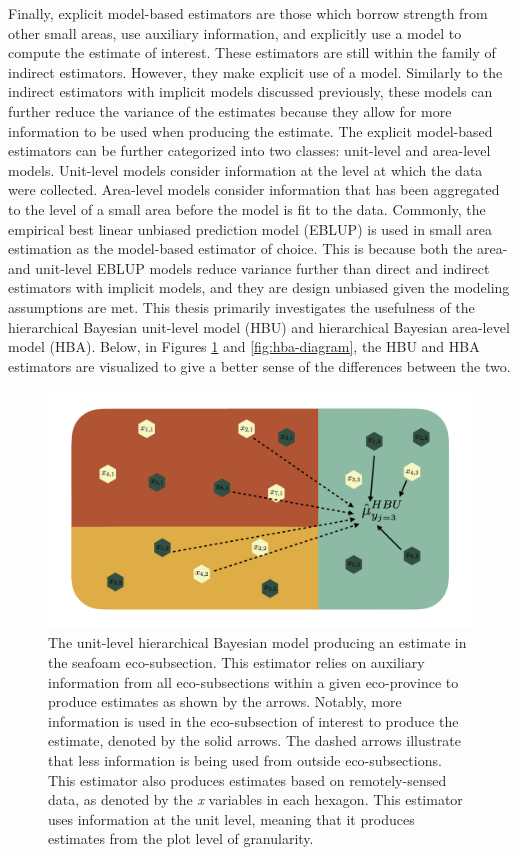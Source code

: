 \documentclass[12pt,twoside]{reedthesis}
\begin{document}
Finally, explicit model-based estimators are those which borrow strength from other small areas, use auxiliary information, and explicitly use a model to compute the estimate of interest. These estimators are still within the family of indirect estimators. However, they make explicit use of a model. Similarly to the indirect estimators with implicit models discussed previously, these models can further reduce the variance of the estimates because they allow for more information to be used when producing the estimate. The explicit model-based estimators can be further categorized into two classes: unit-level and area-level models. Unit-level models consider information at the level at which the data were collected. Area-level models consider information that has been aggregated to the level of a small area before the model is fit to the data. Commonly, the empirical best linear unbiased prediction model (EBLUP) is used in small area estimation as the model-based estimator of choice. This is because both the area- and unit-level EBLUP models reduce variance further than direct and indirect estimators with implicit models, and they are design unbiased given the modeling assumptions are met. This thesis primarily investigates the usefulness of the hierarchical Bayesian unit-level model (HBU) and hierarchical Bayesian area-level model (HBA). Below, in Figures \ref{fig:hbu-diagram} and \ref{fig:hba-diagram}, the HBU and HBA estimators are visualized to give a better sense of the differences between the two.
\begin{figure}

{\centering \includegraphics[width=1\linewidth]{figure/hbu-diagram} 

}

\caption[The unit-level hierarchical Bayesian model]{The unit-level hierarchical Bayesian model producing an estimate in the seafoam eco-subsection. This estimator relies on auxiliary information from all eco-subsections within a given eco-province to produce estimates as shown by the arrows. Notably, more information is used in the eco-subsection of interest to produce the estimate, denoted by the solid arrows. The dashed arrows illustrate that less information is being used from outside eco-subsections. This estimator also produces estimates based on remotely-sensed data, as denoted by the \textit{x} variables in each hexagon. This estimator uses information at the unit level, meaning that it produces estimates from the plot level of granularity.}\label{fig:hbu-diagram}
\end{figure}
\end{document}
